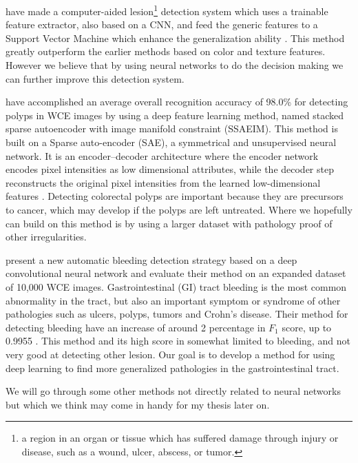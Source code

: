 \documentclass[thesis.tex]{subfiles}
\begin{document}
\citeauthor*{LesionDetection15} have made a computer-aided lesion\footnote{a region in an organ or tissue which has suffered damage through injury or disease, such as a wound, ulcer, abscess, or tumor.} detection system which uses a trainable feature extractor, also based on a CNN, and feed the generic features to a Support Vector Machine which enhance the generalization ability \cite{LesionDetection15}. This method greatly outperform the earlier methods based on color and texture features. However we believe that by using neural networks to do the decision making we can further improve this detection system. 

\medbreak 
\citeauthor*{DeepLearning17} have accomplished an average overall recognition accuracy of 98.0\% for detecting polyps in WCE images by using a deep feature learning method, named stacked sparse autoencoder with image manifold constraint (SSAEIM). This method is built on a Sparse auto-encoder (SAE), a symmetrical and unsupervised neural network. It is an encoder–decoder architecture where the encoder network encodes pixel intensities as low dimensional attributes, while the decoder step reconstructs the original pixel intensities from the learned low-dimensional features \cite{DeepLearning17}. Detecting colorectal polyps are important because they are precursors to cancer, which may develop if the polyps are left untreated. Where we hopefully can build on this method is by using a larger dataset with pathology proof of other irregularities.

\medbreak
\citeauthor*{DeepConvolutional16} present a new automatic bleeding detection strategy based on a deep convolutional neural network and evaluate their method on an expanded dataset of 10,000 WCE images. Gastrointestinal (GI) tract bleeding is the most common abnormality in the tract, but also an important symptom or syndrome of other pathologies such as ulcers, polyps, tumors and Crohn's disease. Their method for detecting bleeding have an increase of around 2 percentage in $F_1$ score, up to 0.9955 \cite{DeepConvolutional16}. This method and its high score in somewhat limited to bleeding, and not very good at detecting other lesion. 
Our goal is to develop a method for using deep learning to find more generalized pathologies in the gastrointestinal tract.

\medbreak
We will go through some other methods not directly related to neural networks but which we think may come in handy for my thesis later on. 
\end{document}
